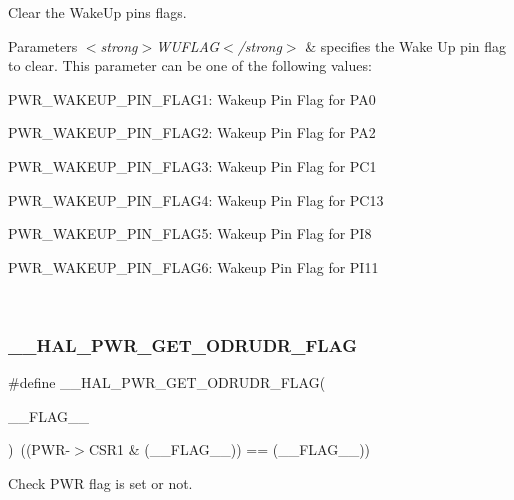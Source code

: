 Clear the Wake\+Up pins flags. 


\begin{DoxyParams}{Parameters}
{\em $<$strong$>$\+W\+U\+F\+L\+A\+G$<$/strong$>$} & specifies the Wake Up pin flag to clear. This parameter can be one of the following values\+: \begin{DoxyItemize}
\item P\+W\+R\+\_\+\+W\+A\+K\+E\+U\+P\+\_\+\+P\+I\+N\+\_\+\+F\+L\+A\+G1\+: Wakeup Pin Flag for P\+A0 \item P\+W\+R\+\_\+\+W\+A\+K\+E\+U\+P\+\_\+\+P\+I\+N\+\_\+\+F\+L\+A\+G2\+: Wakeup Pin Flag for P\+A2 \item P\+W\+R\+\_\+\+W\+A\+K\+E\+U\+P\+\_\+\+P\+I\+N\+\_\+\+F\+L\+A\+G3\+: Wakeup Pin Flag for P\+C1 \item P\+W\+R\+\_\+\+W\+A\+K\+E\+U\+P\+\_\+\+P\+I\+N\+\_\+\+F\+L\+A\+G4\+: Wakeup Pin Flag for P\+C13 \item P\+W\+R\+\_\+\+W\+A\+K\+E\+U\+P\+\_\+\+P\+I\+N\+\_\+\+F\+L\+A\+G5\+: Wakeup Pin Flag for P\+I8 \item P\+W\+R\+\_\+\+W\+A\+K\+E\+U\+P\+\_\+\+P\+I\+N\+\_\+\+F\+L\+A\+G6\+: Wakeup Pin Flag for P\+I11 \end{DoxyItemize}
\\
\hline
\end{DoxyParams}
\mbox{\label{group___p_w_r_ex___exported___macro_ga846a66516ac8a6212f414f3d801169f9}} 
\subsubsection{\texorpdfstring{\_\_HAL\_PWR\_GET\_ODRUDR\_FLAG}{\_\_HAL\_PWR\_GET\_ODRUDR\_FLAG}}
{\footnotesize\ttfamily \#define \+\_\+\+\_\+\+H\+A\+L\+\_\+\+P\+W\+R\+\_\+\+G\+E\+T\+\_\+\+O\+D\+R\+U\+D\+R\+\_\+\+F\+L\+AG(\begin{DoxyParamCaption}\item[{}]{\+\_\+\+\_\+\+F\+L\+A\+G\+\_\+\+\_\+ }\end{DoxyParamCaption})~((P\+WR-\/$>$C\+S\+R1 \& (\+\_\+\+\_\+\+F\+L\+A\+G\+\_\+\+\_\+)) == (\+\_\+\+\_\+\+F\+L\+A\+G\+\_\+\+\_\+))}



Check P\+WR flag is set or not. 


